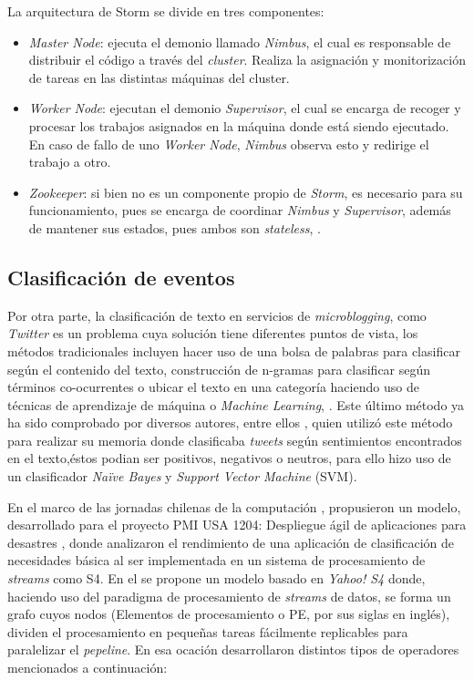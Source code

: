 La arquitectura de Storm se divide en tres componentes:

\begin{itemize}
\item \textit{Master Node}: ejecuta el demonio llamado \textit{Nimbus}, el cual es responsable de distribuir el código a través del \textit{cluster}. Realiza la asignación y monitorización de tareas en las distintas máquinas del cluster.
\item \textit{Worker Node}: ejecutan el demonio \textit{Supervisor}, el cual se encarga de recoger y procesar los trabajos asignados en la máquina donde está siendo ejecutado. En caso de fallo de uno \textit{Worker Node}, \textit{Nimbus} observa esto y redirige el trabajo a otro.
\item \textit{Zookeeper}: si bien no es un componente propio de \textit{Storm}, es necesario para su funcionamiento, pues se encarga de coordinar \textit{Nimbus} y \textit{Supervisor}, además de mantener sus estados, pues ambos son \textit{stateless}, \cite{HuntZookeeper}.
\end{itemize}	

\subsection{Clasificación de eventos}
\label{intro:ea:clasificacion}

Por otra parte, la clasificación de texto en servicios de \textit{microblogging}, como \textit{Twitter} es un problema cuya solución tiene diferentes puntos de vista, los métodos tradicionales incluyen hacer uso de una bolsa de palabras para clasificar según el contenido del texto, construcción de n-gramas para clasificar según términos co-ocurrentes o ubicar el texto en una categoría haciendo uso de técnicas de aprendizaje de máquina o \textit{Machine Learning}, \cite{EventDetection}. 
Este último método ya ha sido comprobado por diversos autores, entre ellos \cite{Maldonado}, quien utilizó este método para realizar su memoria donde clasificaba \textit{tweets} según sentimientos encontrados en el texto,éstos podian ser positivos, negativos o neutros, para ello hizo uso de un clasificador \textit{Naïve Bayes} y \textit{Support Vector Machine} (SVM). 

En el marco de las jornadas chilenas de la computación \cite{WladdimiroPMI}, propusieron un modelo, desarrollado para el proyecto PMI USA 1204: Despliegue ágil de aplicaciones para desastres \cite{PMIProfes}, donde analizaron el rendimiento de una aplicación de clasificación de necesidades básica al ser implementada en un sistema de procesamiento de \textit{streams} como S4. En el se propone un modelo basado en \textit{Yahoo! S4} donde, haciendo uso del paradigma de procesamiento de \textit{streams} de datos, se forma un grafo cuyos nodos (Elementos de procesamiento o PE, por sus siglas en inglés), dividen el procesamiento en pequeñas tareas fácilmente replicables para paralelizar el \textit{pepeline}. En esa ocación desarrollaron distintos tipos de operadores mencionados a continuación:

